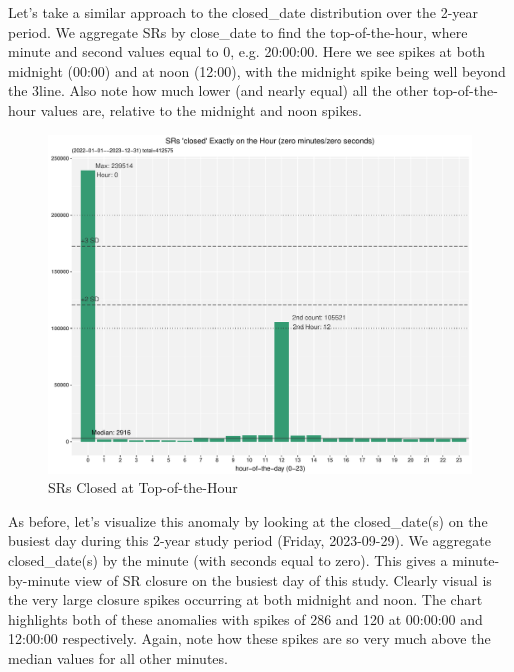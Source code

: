 \documentclass[12pt, titlepage]{article}
\begin{document}
{	Let's take a similar approach to the closed\_date distribution over the 2-year period. We aggregate 
	SRs by close\_date to find the top-of-the-hour, where minute and second values equal to 0, e.g. 20:00:00. 
	Here we see spikes at both midnight (00:00) and at noon (12:00), with the midnight spike being 
	well beyond the 3\textsigma line. Also note how much lower (and nearly equal) all the other
	top-of-the-hour values are, relative to the midnight and noon spikes. 
	
	\begin{figure}[tbp]
		\centering
		\includegraphics[width = \textwidth]{2-year-trend-SR_closed_by_top_of_hour.pdf}
		\caption{SRs Closed at Top-of-the-Hour}
		\label{fig:tophourclosed}
	\end{figure}
	
	As before, let's visualize this anomaly by looking at the closed\_date(s) on the busiest day
	during this 2-year study period (Friday, 2023-09-29). We aggregate closed\_date(s) by the
	minute (with seconds equal to zero). This gives a minute-by-minute view of SR closure
	on the busiest day of this study. Clearly visual is the very large closure spikes occurring
	at both midnight and noon. The chart highlights both of these anomalies with spikes
	of 286 and 120 at 00:00:00 and 12:00:00 respectively. Again, note how these spikes
	are so very much above the median values for all other minutes.

}
\end{document}
